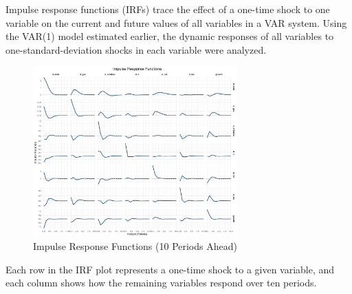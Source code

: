 \documentclass[a4paper,12pt]{article}
\begin{document}
Impulse response functions (IRFs) trace the effect of a one-time shock to one variable on the current and future values of all variables in a VAR system. Using the VAR(1) model estimated earlier, the dynamic responses of all variables to one-standard-deviation shocks in each variable were analyzed.

\begin{figure}[H]
  \centering
  \includegraphics[width=0.7\textwidth]{../results/irf_faceted_plot.png}
  \caption{Impulse Response Functions (10 Periods Ahead)}
\end{figure}

Each row in the IRF plot represents a one-time shock to a given variable, and each column shows how the remaining variables respond over ten periods.
\end{document}
